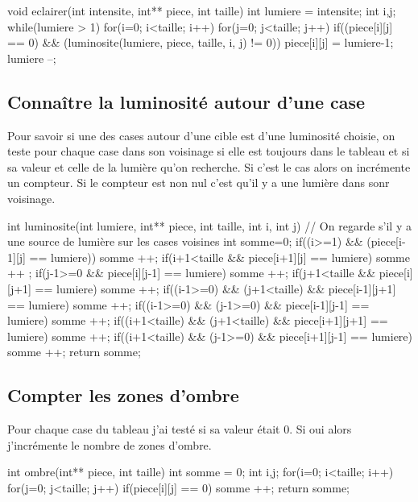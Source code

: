\documentclass{article}
\begin{document}
\begin{boxedverbatim}
void eclairer(int intensite, int** piece, int taille)
{
  int lumiere = intensite;
  int i,j;
  while(lumiere > 1)
    {
      for(i=0; i<taille; i++)
	{
	  for(j=0; j<taille; j++)
	    {
		   if((piece[i][j] == 0) && (luminosite(lumiere, piece, taille, i, j) != 0))
		     {
		       piece[i][j] = lumiere-1;
		     }
		 }
	}
      lumiere --;
    }
}
\end{boxedverbatim}

\subsection{Connaître la luminosité autour d'une case}

Pour savoir si une des cases autour d'une cible est d'une luminosité choisie, on teste pour chaque case dans son voisinage si elle est toujours dans le tableau et si sa valeur et celle de la lumière qu'on recherche. Si c'est le cas alors on incrémente un compteur. Si le compteur est non nul c'est qu'il y a une lumière dans sonr voisinage.\\

\begin{boxedverbatim}
int luminosite(int lumiere, int** piece, int taille, int i, int j)
// On regarde s'il y a une source de lumière sur les cases voisines
{
  int somme=0;
  if((i>=1) && (piece[i-1][j] == lumiere)){
    somme ++;
  }
  if(i+1<taille && piece[i+1][j] == lumiere){
    somme ++ ;
  }
  if(j-1>=0 &&  piece[i][j-1] == lumiere){
    somme ++;
  }
  if(j+1<taille && piece[i][j+1] == lumiere){
    somme ++;
  }
  if((i-1>=0) && (j+1<taille) && piece[i-1][j+1] == lumiere){
    somme ++;
  }
  if((i-1>=0) && (j-1>=0) && piece[i-1][j-1] == lumiere){
    somme ++;
  }
  if((i+1<taille) && (j+1<taille) && piece[i+1][j+1] == lumiere){
    somme ++;
  }
  if((i+1<taille) && (j-1>=0) &&  piece[i+1][j-1] == lumiere){
    somme ++;
  }
  return somme;
}
\end{boxedverbatim}

\subsection{Compter les zones d'ombre}

Pour chaque case du tableau j'ai testé si sa valeur était 0. Si oui alors j'incrémente le nombre de zones d'ombre.

\begin{boxedverbatim}
int ombre(int** piece, int taille)
{
  int somme = 0;
  int i,j;
  for(i=0; i<taille; i++)
    {
      for(j=0; j<taille; j++)
	{
	  if(piece[i][j] == 0)
	  {
	    somme ++;
	  }
	}
    }
  return somme;
}
\end{boxedverbatim}
\end{document}
